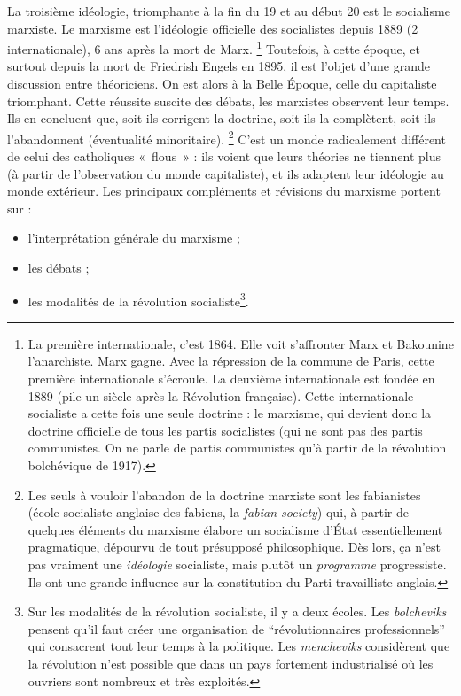 \documentclass[12pt]{report}
\begin{document}
La troisième idéologie, triomphante à la fin du 19 et au début 20 est le socialisme marxiste.
Le marxisme est l’idéologie officielle des socialistes depuis 1889 (2 internationale), 6 ans après la mort de Marx. 
\footnote{La première internationale, c'est 1864. Elle voit s'affronter Marx et Bakounine l'anarchiste. Marx gagne. Avec la répression de la commune de Paris, cette première internationale s'écroule. La deuxième internationale est fondée en 1889 (pile un siècle après la Révolution française). Cette internationale socialiste a cette fois une seule doctrine : le marxisme, qui devient donc la doctrine officielle de tous les partis socialistes (qui ne sont pas des partis communistes. On ne parle de partis communistes qu'à partir de la révolution bolchévique de 1917).}
Toutefois, à cette époque, et surtout depuis la mort de Friedrish Engels en 1895, il est l'objet d'une grande discussion entre théoriciens.
On est alors à la Belle Époque, celle du capitaliste triomphant. 
Cette réussite suscite des débats, les marxistes observent leur temps.
Ils en concluent que, soit ils corrigent la doctrine, soit ils la complètent, soit ils l’abandonnent (éventualité minoritaire). 
\footnote{Les seuls à vouloir l'abandon de la doctrine marxiste sont les fabianistes (école socialiste anglaise des fabiens, la \emph{fabian society}) qui, à partir de quelques éléments du marxisme élabore un socialisme d'État essentiellement pragmatique, dépourvu de tout présupposé philosophique. Dès lors, ça n'est pas vraiment une \emph{idéologie} socialiste, mais plutôt un \emph{programme} progressiste. Ils ont une grande influence sur la constitution du Parti travailliste anglais.}
C’est un monde radicalement différent de celui des catholiques «~flous~» : ils voient que leurs théories ne tiennent plus (à partir de l'observation du monde capitaliste), et ils adaptent leur idéologie au monde extérieur.
Les principaux compléments et révisions du marxisme portent sur :
\begin{itemize}
	\item l’interprétation générale du marxisme ;
	\item les débats ;
	\item les modalités de la révolution socialiste\footnote{Sur les modalités de la révolution socialiste, il y a deux écoles. Les \emph{bolcheviks} pensent qu'il faut créer une organisation de \enquote{révolutionnaires professionnels} qui consacrent tout leur temps à la politique. Les \emph{mencheviks} considèrent que la révolution n'est possible que dans un pays fortement industrialisé où les ouvriers sont nombreux et très exploités.}.
\end{itemize}
\end{document}
